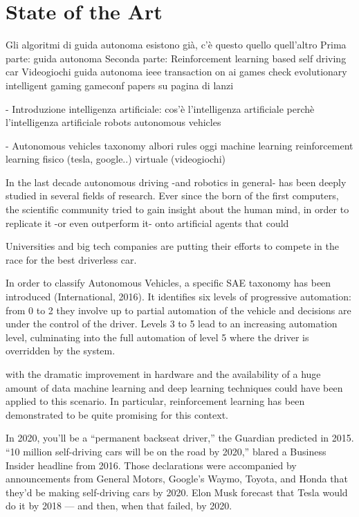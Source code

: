 \chapter{State of the Art}
\label{State of the Art}
\thispagestyle{empty}



Gli algoritmi di guida autonoma esistono già, c'è questo quello quell'altro
	Prima parte: 
		guida autonoma
	Seconda parte:
		Reinforcement learning based self driving car
		Videogiochi guida autonoma
		ieee transaction on ai games
		check evolutionary intelligent gaming
		gameconf
		papers su pagina di lanzi
		
- Introduzione intelligenza artificiale:
	cos'è l'intelligenza artificiale
	perchè l'intelligenza artificiale
	robots
	autonomous vehicles
	
- Autonomous vehicles
	taxonomy
	albori
		rules
	oggi
		machine learning
			reinforcement learning
				fisico (tesla, google..)
				virtuale (videogiochi)
				 
	
			
In the last decade autonomous driving -and robotics in general- has been deeply studied in several fields of research. 
Ever since the born of the first computers, the scientific community tried to gain insight about the human mind, in order to replicate it -or even outperform it- onto artificial agents that could 


Universities and big tech companies are putting their efforts to compete in the race for the best driverless car. 



In order to classify Autonomous Vehicles, a specific SAE taxonomy has been introduced (International, 2016). It identifies six levels of progressive automation: from 0 to 2 they
involve up to partial automation of the vehicle and decisions are under the control of the
driver. Levels 3 to 5 lead to an increasing automation level, culminating into the full
automation of level 5 where the driver is overridden by the system.



with the dramatic improvement in hardware and the availability of a huge amount of data machine learning and deep learning techniques could have been applied to this scenario. 
In particular, reinforcement learning has been demonstrated to be quite promising for this context.




In 2020, you’ll be a “permanent backseat driver,” the Guardian predicted in 2015. “10 million self-driving cars will be on the road by 2020,” blared a Business Insider headline from 2016. Those declarations were accompanied by announcements from General Motors, Google’s Waymo, Toyota, and Honda that they’d be making self-driving cars by 2020. Elon Musk forecast that Tesla would do it by 2018 — and then, when that failed, by 2020.

